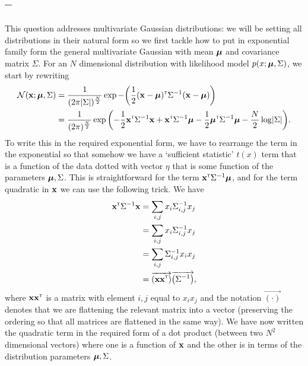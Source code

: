 \documentclass[a4paper]{article}
\newcommand{\questionref}[1]{\Cref{#1} -- \nameref{#1}}
\theoremstyle{definition}
\begin{document}
\subsection{\questionref{q:cp-gaussian}}
This question addresses multivariate Gaussian distributions: we will be setting all distributions in their natural form so we first tackle how to put in exponential family form the general multivariate Gaussian with mean $\boldsymbol{\mu}$ and covariance matrix $\Sigma$. For an $N$ dimensional distribution with likelihood model $p(x; \boldsymbol{\mu}, \Sigma)$, we start by rewriting
\begin{align}
\NormDist{\vx; \vmu, \Sigma} &= \frac{1}{(2 \pi \detbar{\Sigma})^\frac{N}{2}} \exp{-\left(\frac{1}{2}(\vx - \vmu)\transpose \Sigma^{-1} (\vx - \vmu)\right)}  \\
 & = \frac{1}{(2 \pi)^\frac{N}{2}} \exp{\left(-\frac{1}{2}\vx\transpose \Sigma^{-1} \vx + \vx\transpose \Sigma^{-1} \vmu -\frac{1}{2}\vmu\transpose\Sigma^{-1}\vmu - \frac{N}{2}\log\detbar{\Sigma}\right)}.
\end{align}
To write this in the required exponential form, we have to rearrange the term in the exponential so that somehow we have a `sufficient statistic' $t(x)$ term that is a function of the data dotted with vector $\eta$ that is some function of the parameters $\boldsymbol{\mu}, \Sigma$. This is straightforward for the term $\mathbf{x} ^\mathrm{\textsf{\tiny T}} \Sigma^{-1} \boldsymbol{\mu}$, and for the term quadratic in $\mathbf{x}$ we can use the following trick. We have
\begin{align}
\vx\transpose \Sigma^{-1} \vx &= \sum_{i,j} x_i \Sigma^{-1}_{i, j} x_j \\
&= \sum_{i,j} x_i \Sigma^{-1}_{i, j} x_j \\
& = \sum_{i, j} \Sigma^{-1}_{i,j} x_i x_j \\
& = \overrightarrow{\left(\vx \vx\transpose\right)} \overrightarrow{\left(\Sigma^{-1}\right)},
\end{align}
where $\mathbf{x} \mathbf{x}^\mathrm{\textsf{\tiny T}}$ is a matrix with element $i,j$ equal to $x_i x_j$ and the notation $\overrightarrow{\left(\cdot\right)}$ denotes that we are flattening the relevant matrix into a vector (preserving the ordering so that all matrices are flattened in the same way). We have now written the quadratic term in the required form of a dot product (between two $N^2$ dimensional vectors) where one is a function of $\mathbf{x}$ and the other is in terms of the distribution parameters $\boldsymbol{\mu}, \Sigma$.
\end{document}
